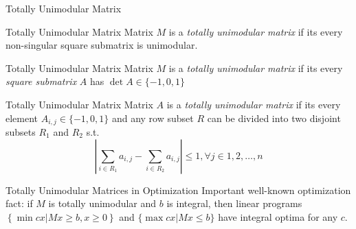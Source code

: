 \documentclass[presentation,professionalfonts]{beamer}
\begin{document}
\begin{frame}{Totally Unimodular Matrix}
  \begin{definition}{Totally Unimodular Matrix}
    Matrix \(M\) is a \emph{totally unimodular matrix} if its every
    non-singular square submatrix is unimodular.
  \end{definition}

  \begin{definition}{Totally Unimodular Matrix}
    Matrix \(M\) is a \emph{totally unimodular matrix} if its every
    \emph{square submatrix} \(A\) has \(\det A\in \{-1, 0, 1\}\)
  \end{definition}

  \begin{definition}{Totally Unimodular Matrix}
    Matrix \(A\) is a \emph{totally unimodular matrix} if its every
    element \(A_{i, j}\in \{-1, 0, 1\}\) and any row subset \(R\) can
    be divided into two disjoint subsets \(R_1\) and \(R_2\) s.t.
    \[\left|\sum_{i\in R_1} a_{i, j} - \sum_{i\in R_2}a_{i, j}\right| \leq 1, \forall j\in{1, 2, \dots, n}\]
    \end{definition}
\end{frame}

\begin{frame}{Totally Unimodular Matrices in Optimization}
  Important well-known optimization fact: if \(M\) is totally
  unimodular and \(b\) is integral, then linear programs \(\left\{\min
  cx | Mx \geq b, x\geq 0\right\}\) and \(\{\max cx | Mx \leq b\}\)
  have integral optima for any \(c\).
\end{frame}
\end{document}
